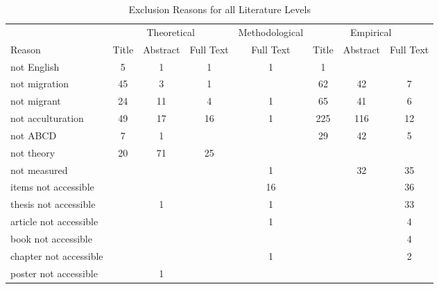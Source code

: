 \begin{table}
\begin{minipage}[t][\textheight][t]{\textwidth}

\caption{\label{tab:ExclusionsCombined}Exclusion Reasons for all Literature Levels}
\begin{tabular}[t]{lccccccc}
\toprule
\multicolumn{1}{c}{ } & \multicolumn{3}{c}{Theoretical} & \multicolumn{1}{c}{Methodological} & \multicolumn{3}{c}{Empirical} \\
\cmidrule(l{3pt}r{3pt}){2-4} \cmidrule(l{3pt}r{3pt}){5-5} \cmidrule(l{3pt}r{3pt}){6-8}
Reason & Title & Abstract & Full Text & Full Text & Title & Abstract & Full Text\\
\midrule
not English & 5 & 1 & 1 & 1 & 1 &  & \\
not migration & 45 & 3 & 1 &  & 62 & 42 & 7\\
not migrant & 24 & 11 & 4 & 1 & 65 & 41 & 6\\
not acculturation & 49 & 17 & 16 & 1 & 225 & 116 & 12\\
not ABCD & 7 & 1 &  &  & 29 & 42 & 5\\
not theory & 20 & 71 & 25 &  &  &  & \\
not measured &  &  &  & 1 &  & 32 & 35\\
items not accessible &  &  &  & 16 &  &  & 36\\
thesis not accessible &  & 1 &  & 1 &  &  & 33\\
article not accessible &  &  &  & 1 &  &  & 4\\
book not accessible &  &  &  &  &  &  & 4\\
chapter not accessible &  &  &  & 1 &  &  & 2\\
poster not accessible &  & 1 &  &  &  &  & \\
\bottomrule
\end{tabular}
\end{minipage}
\end{table}
